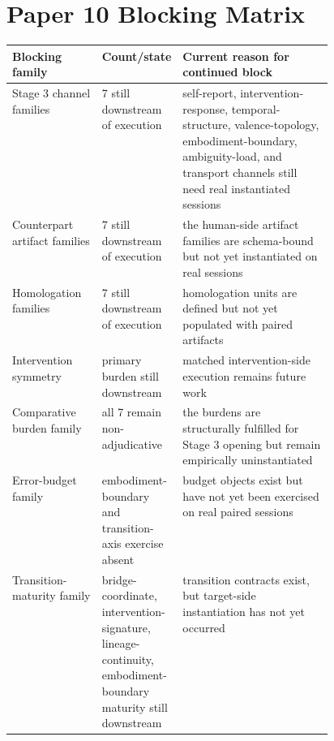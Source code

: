 \documentclass[11pt,a4paper]{article}
\theoremstyle{definition}
\begin{document}
\section{Paper 10 Blocking Matrix}
\begin{center}
\small
\begin{tabularx}{\linewidth}{@{}p{0.28\linewidth}p{0.18\linewidth}Y@{}}
\toprule
Blocking family & Count/state & Current reason for continued block \\
\midrule
Stage 3 channel families & 7 still downstream of execution & self-report, intervention-response, temporal-structure, valence-topology, embodiment-boundary, ambiguity-load, and transport channels still need real instantiated sessions \\
Counterpart artifact families & 7 still downstream of execution & the human-side artifact families are schema-bound but not yet instantiated on real sessions \\
Homologation families & 7 still downstream of execution & homologation units are defined but not yet populated with paired artifacts \\
Intervention symmetry & primary burden still downstream & matched intervention-side execution remains future work \\
Comparative burden family & all 7 remain non-adjudicative & the burdens are structurally fulfilled for Stage 3 opening but remain empirically uninstantiated \\
Error-budget family & embodiment-boundary and transition-axis exercise absent & budget objects exist but have not yet been exercised on real paired sessions \\
Transition-maturity family & bridge-coordinate, intervention-signature, lineage-continuity, embodiment-boundary maturity still downstream & transition contracts exist, but target-side instantiation has not yet occurred \\
\bottomrule
\end{tabularx}
\normalsize
\end{center}
\end{document}
